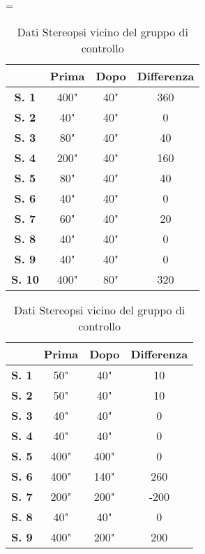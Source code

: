 
\\\ \\\ \\\
\begin{table}[H]
\centering
\setlength\tabcolsep{4pt}
\begin{minipage}{0.48\textwidth}
\centering
\tablewidth=\textwidth

\begin{tabular}{|c|c|c|c|} \hline
{\textbf{}} & {\textbf{Prima}} & {\textbf{Dopo}}& {\textbf{Differenza}} \\ \hline
\textbf{S. 1} & 400" & 40" & 360 \\ \hline
\textbf{S. 2} & 40" & 40" & 0 \\ \hline
\textbf{S. 3} & 80" & 40" & 40 \\ \hline
\textbf{S. 4} & 200" & 40" & 160 \\ \hline
\textbf{S. 5} & 80" & 40" & 40 \\ \hline
\textbf{S. 6} & 40" & 40" & 0 \\ \hline
\textbf{S. 7} & 60" & 40" & 20 \\ \hline
\textbf{S. 8} & 40" & 40" & 0 \\ \hline
\textbf{S. 9} & 40" & 40" & 0 \\ \hline
\textbf{S. 10} & 400" & 80" & 320 \\ \hline
\end{tabular} 
\caption{Dati Stereopsi vicino del gruppo sperimentale}

\label{tab:accuracy} 
\end{minipage}%
\hfill
\begin{minipage}{0.48\textwidth}
\centering

\begin{tabular}{|c|c|c|c|} \hline
{\textbf{}} & {\textbf{Prima}} & {\textbf{Dopo}}& {\textbf{Differenza}} \\ \hline
\textbf{S. 1} & 50" & 40" & 10 \\ \hline
\textbf{S. 2} & 50" & 40" & 10 \\ \hline
\textbf{S. 3} & 40" & 40" & 0 \\ \hline
\textbf{S. 4} & 40" & 40" & 0 \\ \hline
\textbf{S. 5} & 400" & 400" & 0 \\ \hline
\textbf{S. 6} & 400" & 140" & 260 \\ \hline
\textbf{S. 7} & 200" & 200" & -200\\ \hline
\textbf{S. 8} & 40" & 40" & 0 \\ \hline
\textbf{S. 9} & 400" & 200" & 200 \\ \hline
\end{tabular} 
\caption{Dati Stereopsi vicino del gruppo di controllo}

 \label{tab:ompdiff} 
\end{minipage}
\end{table}




